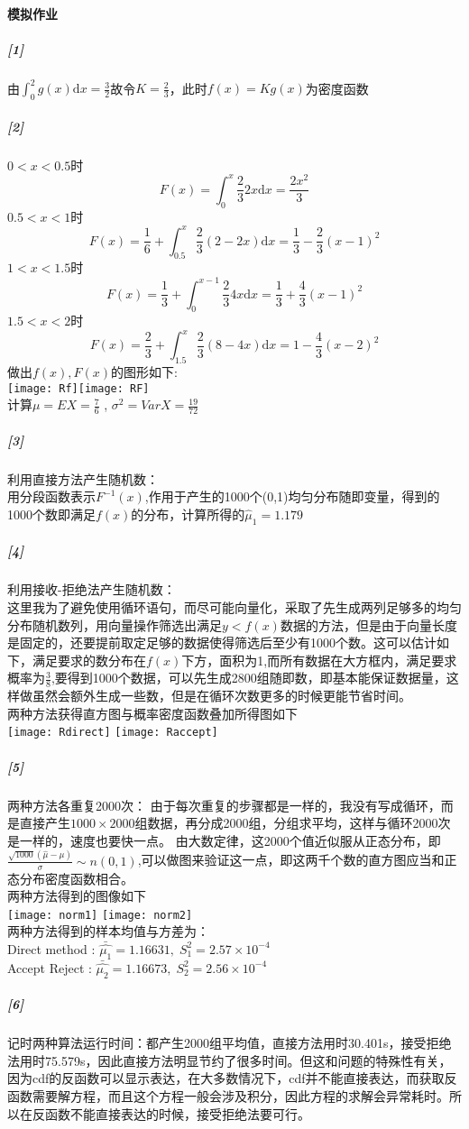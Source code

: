 \documentclass[11pt,a4paper]{ctexart}
\newcommand{\dd}[0]{\mathrm{d}}
\begin{document}
\paragraph{模拟作业}
\subparagraph{[1]}
由\(\displaystyle \int_{0}^{2}g(x)\mathrm{d}x = \frac{3}{2}\)故令\(K = \frac{2}{3}\)，此时\(f(x) = Kg(x)\)为密度函数
\subparagraph{[2]}
\(0 < x < 0.5\)时
\[F(x) = \int_{0}^{x}\frac{2}{3}2x\dd x = \frac{2x^2}{3} \]
\(0.5 < x < 1\)时
\[F(x) = \frac{1}{6} + \int_{0.5}^{x}\frac{2}{3}(2 - 2x)\dd x = \frac{1}{3} - \frac{2}{3}(x - 1)^2\]
\(1 < x < 1.5\)时
\[F(x) = \frac{1}{3} + \int_{0}^{x - 1}\frac{2}{3}4x\dd x = \frac{1}{3} + \frac{4}{3}(x - 1)^2\]
\(1.5 < x < 2\)时
\[F(x) = \frac{2}{3} + \int_{1.5}^{x}\frac{2}{3}(8 - 4x)\dd x = 1 - \frac{4}{3}(x - 2)^2  \]
做出\(f(x),F(x)\)的图形如下:\\
\texttt{[image: Rf]}\texttt{[image: RF]}\\
计算\(\displaystyle \mu = EX = \frac{7}{6}\) , \(\displaystyle\sigma^2 = VarX = \frac{19}{72} \)
\subparagraph{[3]}
利用直接方法产生随机数：\\
\indent 用分段函数表示\(F^{-1}(x)\),作用于产生的1000个(0,1)均匀分布随即变量，得到的1000个数即满足\(f(x)\)的分布，计算所得的\(\hat{\mu}_1 = 1.179\)
\subparagraph{[4]}
利用接收-拒绝法产生随机数：\\
\indent 这里我为了避免使用循环语句，而尽可能向量化，采取了先生成两列足够多的均匀分布随机数列，用向量操作筛选出满足\(y < f(x)\)数据的方法，但是由于向量长度是固定的，还要提前取定足够的数据使得筛选后至少有1000个数。这可以估计如下，满足要求的数分布在\(f(x)\)下方，面积为1,而所有数据在大方框内，满足要求概率为\(\frac{3}{8}\),要得到1000个数据，可以先生成2800组随即数，即基本能保证数据量，这样做虽然会额外生成一些数，但是在循环次数更多的时候更能节省时间。\\
两种方法获得直方图与概率密度函数叠加所得图如下\\
{\centering \texttt{[image: Rdirect]} \texttt{[image: Raccept]}}
\subparagraph{[5]}
两种方法各重复2000次：
由于每次重复的步骤都是一样的，我没有写成循环，而是直接产生\(1000\times2000\)组数据，再分成2000组，分组求平均，这样与循环2000次是一样的，速度也要快一点。
由大数定律，这2000个值近似服从正态分布，即\(\displaystyle \frac{\sqrt{1000}(\hat{\mu} - \mu)}{\sigma} \sim n(0,1)\),可以做图来验证这一点，即这两千个数的直方图应当和正态分布密度函数相合。\\
两种方法得到的图像如下\\
{\centering \texttt{[image: norm1]} \texttt{[image: norm2]}}\\
两种方法得到的样本均值与方差为：\\
Direct method : \(\bar{\hat{\mu_1}}=1.16631 ,\;S^2_1 = 2.57\times10^{-4}\)\\
Accept Reject : \(\bar{\hat{\mu_2}}=1.16673 ,\;S^2_2 = 2.56\times10^{-4}\)\\
\subparagraph{[6]}
\indent 记时两种算法运行时间：都产生2000组平均值，直接方法用时30.401s，接受拒绝法用时75.579s，因此直接方法明显节约了很多时间。但这和问题的特殊性有关，因为cdf的反函数可以显示表达，在大多数情况下，cdf并不能直接表达，而获取反函数需要解方程，而且这个方程一般会涉及积分，因此方程的求解会异常耗时。所以在反函数不能直接表达的时候，接受拒绝法要可行。
\end{document}
